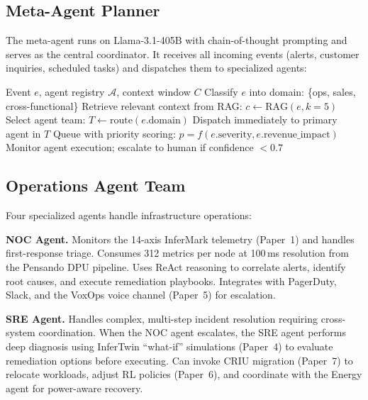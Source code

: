 \documentclass[conference,10pt,letterpaper]{IEEEtran}
\begin{document}
\subsection{Meta-Agent Planner}

The meta-agent runs on Llama-3.1-405B with chain-of-thought prompting and serves as the central coordinator. It receives all incoming events (alerts, customer inquiries, scheduled tasks) and dispatches them to specialized agents:

\begin{algorithm}[!t]
\caption{Meta-Agent Dispatch}
\label{alg:meta}
\begin{algorithmic}[1]
\REQUIRE Event $e$, agent registry $\mathcal{A}$, context window $C$
\STATE Classify $e$ into domain: \{ops, sales, cross-functional\}
\STATE Retrieve relevant context from RAG: $c \leftarrow \text{RAG}(e, k{=}5)$
\STATE Select agent team: $T \leftarrow \text{route}(e.\text{domain})$
    \STATE Dispatch immediately to primary agent in $T$
\ELSE
    \STATE Queue with priority scoring: $p = f(e.\text{severity}, e.\text{revenue\_impact})$
\ENDIF
\STATE Monitor agent execution; escalate to human if confidence $< 0.7$
\end{algorithmic}
\end{algorithm}

\subsection{Operations Agent Team}

Four specialized agents handle infrastructure operations:

\textbf{NOC Agent.} Monitors the 14-axis InferMark telemetry (Paper~1) and handles first-response triage. Consumes 312 metrics per node at 100\,ms resolution from the Pensando DPU pipeline. Uses ReAct reasoning to correlate alerts, identify root causes, and execute remediation playbooks. Integrates with PagerDuty, Slack, and the VoxOps voice channel (Paper~5) for escalation.

\textbf{SRE Agent.} Handles complex, multi-step incident resolution requiring cross-system coordination. When the NOC agent escalates, the SRE agent performs deep diagnosis using InferTwin ``what-if'' simulations (Paper~4) to evaluate remediation options before executing. Can invoke CRIU migration (Paper~7) to relocate workloads, adjust RL policies (Paper~6), and coordinate with the Energy agent for power-aware recovery.
\end{document}
